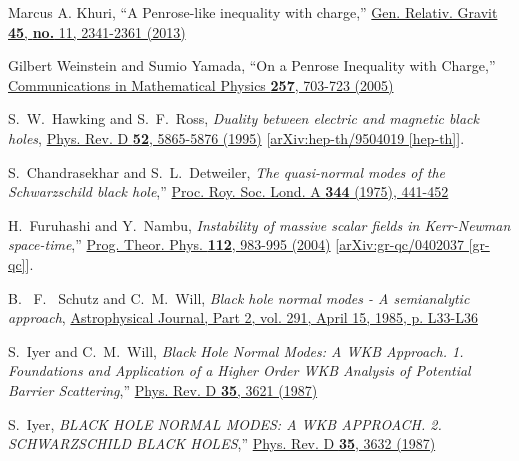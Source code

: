 \documentclass[pr, twocolumn, preprintnumbers, showpacs,footnoteadded, superscriptaddress,nofootinbib,longbibliography]{revtex4-1}
\begin{document}
\begin{thebibliography}{99}
Marcus A. Khuri,
``A Penrose-like inequality with charge,''
\href{https://doi.org/10.1007/s10714-013-1588-8}{Gen. Relativ. Gravit \textbf{45}, \textbf{no.} 11, 2341-2361 (2013)}

Gilbert Weinstein and Sumio Yamada,
``On a Penrose Inequality with Charge,''
\href{https://doi.org/10.1007/s00220-005-1355-0}{Communications in Mathematical Physics \textbf{257}, 703-723 (2005)}




S.~W.~Hawking and S.~F.~Ross,
\emph{Duality between electric and magnetic black holes},
\href{https://journals.aps.org/prd/abstract/10.1103/PhysRevD.52.5865}{Phys. Rev. D \textbf{52}, 5865-5876 (1995)}
[\href{https://arxiv.org/pdf/hep-th/9504019.pdf}{arXiv:hep-th/9504019 [hep-th]}].

S.~Chandrasekhar and S.~L.~Detweiler,
\emph{{The quasi-normal modes of the Schwarzschild black hole}},''
\href{https://royalsocietypublishing.org/doi/10.1098/rspa.1975.0112}{Proc. Roy. Soc. Lond. A \textbf{344} (1975), 441-452}

H.~Furuhashi and Y.~Nambu,
\emph{{Instability of massive scalar fields in Kerr-Newman space-time}},''
\href{https://academic.oup.com/ptp/article/112/6/983/1912137}{Prog. Theor. Phys. \textbf{112}, 983-995 (2004)}
[\href{https://arxiv.org/pdf/gr-qc/0402037.pdf}{arXiv:gr-qc/0402037 [gr-qc]}].

B. ~F. ~Schutz and C.~M.~Will,
\emph{Black hole normal modes - A semianalytic approach},
\href{http://adsabs.harvard.edu/full/1985ApJ...291L..33S}{Astrophysical Journal, Part 2, vol. 291, April 15, 1985, p. L33-L36}

S.~Iyer and C.~M.~Will,
\emph{{Black Hole Normal Modes: A {WKB} Approach. 1. Foundations and Application of a Higher Order {WKB} Analysis of Potential Barrier Scattering}},''
\href{https://journals.aps.org/prd/pdf/10.1103/PhysRevD.35.3621}{Phys. Rev. D \textbf{35}, 3621 (1987)}

S.~Iyer,
\emph{{BLACK HOLE NORMAL MODES: A WKB APPROACH. 2. SCHWARZSCHILD BLACK HOLES}},''
\href{https://journals.aps.org/prd/pdf/10.1103/PhysRevD.35.3632}{Phys. Rev. D \textbf{35}, 3632 (1987)}


\end{thebibliography}
\end{document}
